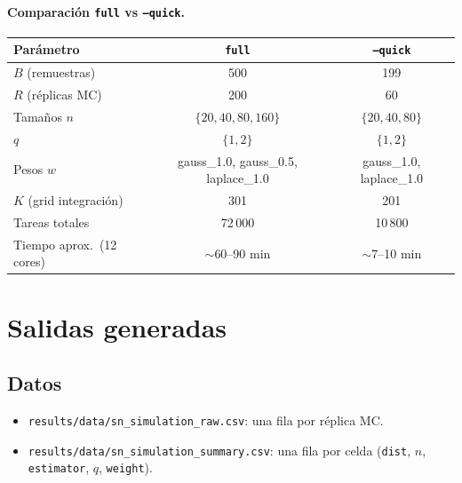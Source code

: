 \documentclass[11pt,a4paper]{article}
\begin{document}
\paragraph{Comparación \texttt{full} vs \texttt{--quick}.}
\begin{center}\small
\begin{tabular}{@{}lcc@{}}
\toprule
Parámetro & \texttt{full} & \texttt{--quick} \\
\midrule
$B$ (remuestras) & 500 & 199 \\
$R$ (réplicas MC) & 200 & 60 \\
Tamaños $n$ & $\{20,40,80,160\}$ & $\{20,40,80\}$ \\
$q$ & $\{1,2\}$ & $\{1,2\}$ \\
Pesos $w$ & gauss\_1.0, gauss\_0.5, laplace\_1.0 & gauss\_1.0, laplace\_1.0 \\
$K$ (grid integración) & 301 & 201 \\
Tareas totales & 72\,000 & 10\,800 \\
Tiempo aprox.\ (12 cores) & $\sim$60--90 min & $\sim$7--10 min \\
\bottomrule
\end{tabular}
\end{center}

\section{Salidas generadas}

\subsection{Datos}
\begin{itemize}[leftmargin=*]
    \item \texttt{results/data/sn\_simulation\_raw.csv}: una fila por réplica MC.
    \item \texttt{results/data/sn\_simulation\_summary.csv}: una fila por celda
        (\texttt{dist}, $n$, \texttt{estimator}, $q$, \texttt{weight}).
\end{itemize}
\end{document}
